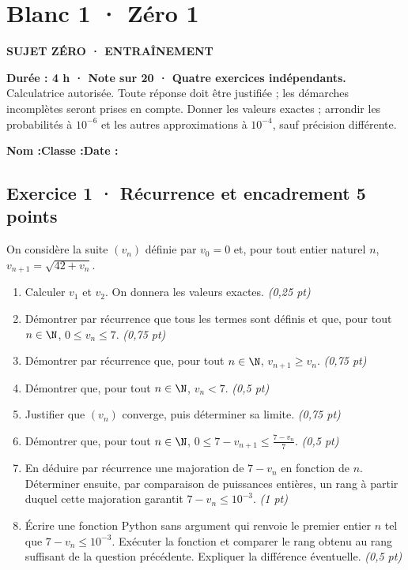 \clearpage{}\label{sujet:5-1}

\section*{Blanc 1 · Zéro 1}

{\sffamily\bfseries\color{teal}SUJET ZÉRO · ENTRAÎNEMENT\par}

\textbf{Durée : 4 h · Note sur 20 · Quatre exercices indépendants.}\\Calculatrice autorisée. Toute réponse doit être justifiée ; les démarches incomplètes seront prises en compte. Donner les valeurs exactes ; arrondir les probabilités à $10^{-6}$ et les autres approximations à $10^{-4}$, sauf précision différente.

\smallskip\textbf{Nom :}\enspace\dotfill\quad\textbf{Classe :}\enspace\dotfill\quad\textbf{Date :}\enspace\dotfill

\subsection*{Exercice 1 · Récurrence et encadrement \hfill 5 points}On considère la suite $(v_n)$ définie par $v_0=0$ et, pour tout entier naturel $n$, $v_{n+1}=\sqrt{42+v_n}$.

\begin{enumerate}

\item Calculer $v_1$ et $v_2$. On donnera les valeurs exactes. \hfill\textit{(0,25 pt)}

\item Démontrer par récurrence que tous les termes sont définis et que, pour tout $n\in\N$, $0\le v_n\le7$. \hfill\textit{(0,75 pt)}

\item Démontrer par récurrence que, pour tout $n\in\N$, $v_{n+1}\ge v_n$. \hfill\textit{(0,75 pt)}

\item Démontrer que, pour tout $n\in\N$, $v_n<7$. \hfill\textit{(0,5 pt)}

\item Justifier que $(v_n)$ converge, puis déterminer sa limite. \hfill\textit{(0,75 pt)}

\item Démontrer que, pour tout $n\in\N$, $0\le 7-v_{n+1}\le\frac{7-v_n}{7}$. \hfill\textit{(0,5 pt)}

\item En déduire par récurrence une majoration de $7-v_n$ en fonction de $n$. Déterminer ensuite, par comparaison de puissances entières, un rang à partir duquel cette majoration garantit $7-v_n\le10^{-3}$. \hfill\textit{(1 pt)}

\item Écrire une fonction Python sans argument qui renvoie le premier entier $n$ tel que $7-v_n\le10^{-3}$. Exécuter la fonction et comparer le rang obtenu au rang suffisant de la question précédente. Expliquer la différence éventuelle. \hfill\textit{(0,5 pt)}

\end{enumerate}

